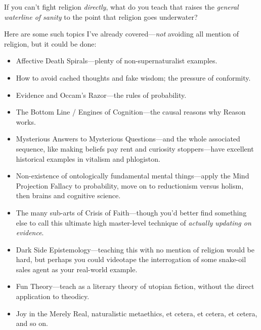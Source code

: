{
 If you can't fight religion \textit{directly},
what do you teach that raises the \textit{general waterline of sanity}
to the point that religion goes underwater?}

{
 Here are some such topics I've already
covered---\textit{not} avoiding all mention of religion, but it could
be done:}

\begin{itemize}
\item {
 Affective Death Spirals---plenty of non-supernaturalist examples.}

\item {
 How to avoid cached thoughts and fake wisdom; the pressure of
conformity.}

\item {
 Evidence and Occam's Razor---the rules of
probability.}

\item {
 The Bottom Line / Engines of Cognition---the causal reasons why
Reason works.}

\item {
 Mysterious Answers to Mysterious Questions---and the whole
associated sequence, like making beliefs pay rent and curiosity
stoppers---have excellent historical examples in vitalism and
phlogiston.}

\item {
 Non-existence of ontologically fundamental mental things---apply
the Mind Projection Fallacy to probability, move on to reductionism
versus holism, then brains and cognitive science.}

\item {
 The many sub-arts of Crisis of Faith---though
you'd better find something else to call this ultimate
high master-level technique of \textit{actually updating on evidence}.}

\item {
 Dark Side Epistemology---teaching this with no mention of religion
would be hard, but perhaps you could videotape the interrogation of
some snake-oil sales agent as your real-world example.}

\item {
 Fun Theory{}---teach as a literary theory of utopian fiction,
without the direct application to theodicy.}

\item {
 Joy in the Merely Real, naturalistic metaethics, et cetera, et
 cetera, et cetera, and so on.}
\end{itemize}

